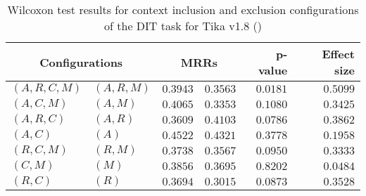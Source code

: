 
\begin{table}
\begin{spacing}{1.2}
\centering
\caption{Wilcoxon test results for context inclusion and exclusion configurations of the DIT task for Tika v1.8 (\ctwo)}
\label{table:versus-wilcox-tika-dit-context}
\begin{tabular}{ll|rr|rr}
\toprule
      \multicolumn{2}{c|}{Configurations} &                \multicolumn{2}{c|}{MRRs} &             p-value & Effect size \\
\midrule
 $(A,R,C,M)$ &  $(A,R,M)$ &  $\bm{0.3943}$ &       $0.3563$ & $0.0181$ &    $0.5099$ \\
   $(A,C,M)$ &    $(A,M)$ &  $\bm{0.4065}$ &       $0.3353$ & $0.1080$ &    $0.3425$ \\
   $(A,R,C)$ &    $(A,R)$ &       $0.3609$ &  $\bm{0.4103}$ & $0.0786$ &    $0.3862$ \\
     $(A,C)$ &      $(A)$ &  $\bm{0.4522}$ &       $0.4321$ & $0.3778$ &    $0.1958$ \\
   $(R,C,M)$ &    $(R,M)$ &  $\bm{0.3738}$ &       $0.3567$ & $0.0950$ &    $0.3333$ \\
     $(C,M)$ &      $(M)$ &  $\bm{0.3856}$ &       $0.3695$ & $0.8202$ &    $0.0484$ \\
     $(R,C)$ &      $(R)$ &  $\bm{0.3694}$ &       $0.3015$ & $0.0873$ &    $0.3528$ \\
\bottomrule
\end{tabular}

\end{spacing}
\end{table}

